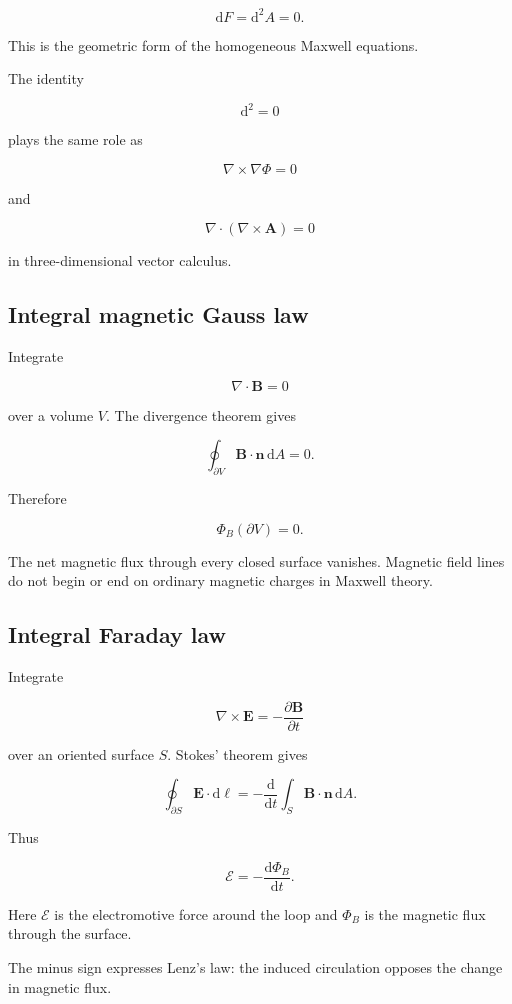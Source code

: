 \[
\boxed{
\mathrm{d}F
=
\mathrm{d}^{2}A
=0
}.
\]

This is the geometric form of the homogeneous Maxwell equations.

The identity

\[
\mathrm{d}^{2}=0
\]

plays the same role as

\[
\nabla\times\nabla\Phi=0
\]

and

\[
\nabla\cdot
\left(
\nabla\times\mathbf{A}
\right)=0
\]

in three-dimensional vector calculus.

\subsection{Integral magnetic Gauss law}

Integrate

\[
\nabla\cdot\mathbf{B}=0
\]

over a volume \(V\). The divergence theorem gives

\[
\oint_{\partial V}
\mathbf{B}\cdot\mathbf{n}
\,\mathrm{d}A
=0.
\]

Therefore

\[
\boxed{
\Phi_B(\partial V)=0
}.
\]

The net magnetic flux through every closed surface vanishes. Magnetic field lines do not begin or end on ordinary magnetic charges in Maxwell theory.

\subsection{Integral Faraday law}

Integrate

\[
\nabla\times\mathbf{E}
=
-
\frac{\partial\mathbf{B}}{\partial t}
\]

over an oriented surface \(S\). Stokes' theorem gives

\[
\oint_{\partial S}
\mathbf{E}\cdot\mathrm{d}\boldsymbol{\ell}
=
-
\frac{\mathrm{d}}{\mathrm{d}t}
\int_S
\mathbf{B}\cdot\mathbf{n}
\,\mathrm{d}A.
\]

Thus

\[
\boxed{
\mathcal{E}
=
-
\frac{\mathrm{d}\Phi_B}{\mathrm{d}t}
}.
\]

Here \(\mathcal{E}\) is the electromotive force around the loop and \(\Phi_B\) is the magnetic flux through the surface.

The minus sign expresses Lenz's law: the induced circulation opposes the change in magnetic flux.

